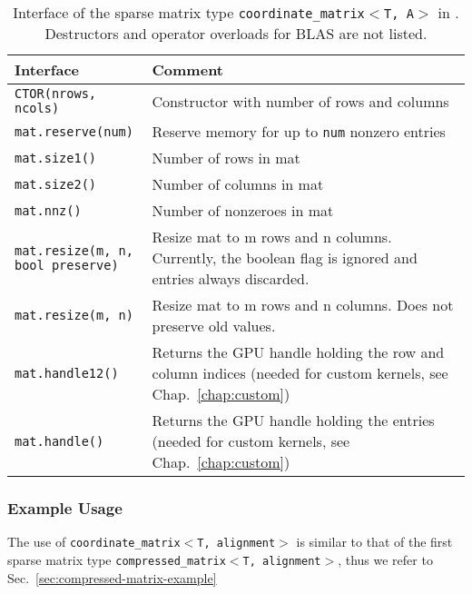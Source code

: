 \begin{table}[tb]
\begin{center}
\begin{tabular}{p{6.5cm}|p{8cm}}
Interface & Comment\\
\hline
\texttt{CTOR(nrows, ncols)}    & Constructor with number of rows and columns \\
\texttt{mat.reserve(num)}    & Reserve memory for up to \texttt{num} nonzero entries \\
\texttt{mat.size1()}            & Number of rows in mat \\
\texttt{mat.size2()}            & Number of columns in mat \\
\texttt{mat.nnz()}		& Number of nonzeroes in mat \\
\parbox{6cm}{\texttt{mat.resize(m, n, \\
           \hphantom{mat.resize(}bool preserve)}}    & Resize mat to m rows and n columns. Currently, the boolean flag is ignored and entries always discarded. \\
\texttt{mat.resize(m, n)}    & Resize mat to m rows and n columns. Does not preserve old values. \\
\texttt{mat.handle12()}  & Returns the GPU handle holding the row and column indices (needed for custom kernels, see Chap.~\ref{chap:custom}) \\
\texttt{mat.handle()}  & Returns the GPU handle holding the entries (needed for custom kernels, see Chap.~\ref{chap:custom})
\end{tabular}
\caption{Interface of the sparse matrix type \texttt{coordinate\_matrix$<$T, A$>$} in \ViennaCL. Destructors and operator overloads for BLAS are not listed.}
\label{tab:coordinate-matrix-interface}
\end{center}
\end{table}

\subsubsection{Example Usage}
The use of \texttt{coordinate\_matrix$<$T, alignment$>$} is similar to that of the first sparse matrix type 
\texttt{compressed\_matrix$<$T, alignment$>$}, thus we refer to Sec.~\ref{sec:compressed-matrix-example}


